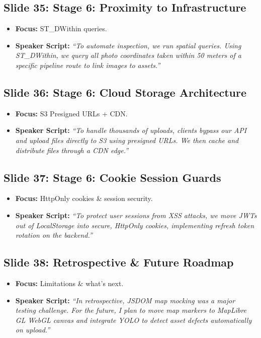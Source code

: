 \documentclass[11pt]{article}
\begin{document}
\subsection{Slide 35: Stage 6: Proximity to Infrastructure}
\begin{itemize}
    \item \textbf{Focus:} ST_DWithin queries.
    \item \textbf{Speaker Script:} 
    \textit{``To automate inspection, we run spatial queries. Using ST\_DWithin, we query all photo coordinates taken within 50 meters of a specific pipeline route to link images to assets.''}
\end{itemize}

\subsection{Slide 36: Stage 6: Cloud Storage Architecture}
\begin{itemize}
    \item \textbf{Focus:} S3 Presigned URLs + CDN.
    \item \textbf{Speaker Script:} 
    \textit{``To handle thousands of uploads, clients bypass our API and upload files directly to S3 using presigned URLs. We then cache and distribute files through a CDN edge.''}
\end{itemize}

\subsection{Slide 37: Stage 6: Cookie Session Guards}
\begin{itemize}
    \item \textbf{Focus:} HttpOnly cookies & session security.
    \item \textbf{Speaker Script:} 
    \textit{``To protect user sessions from XSS attacks, we move JWTs out of LocalStorage into secure, HttpOnly cookies, implementing refresh token rotation on the backend.''}
\end{itemize}

\subsection{Slide 38: Retrospective \& Future Roadmap}
\begin{itemize}
    \item \textbf{Focus:} Limitations & what's next.
    \item \textbf{Speaker Script:} 
    \textit{``In retrospective, JSDOM map mocking was a major testing challenge. For the future, I plan to move map markers to MapLibre GL WebGL canvas and integrate YOLO to detect asset defects automatically on upload.''}
\end{itemize}
\end{document}

